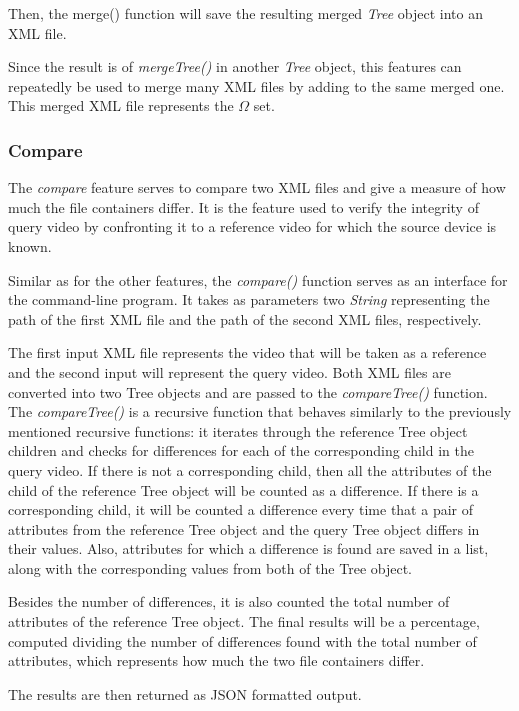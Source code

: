 Then, the merge() function will save the resulting merged \emph{Tree} object into an XML file.

Since the result is of \emph{mergeTree()} in another \emph{Tree} object, this features can repeatedly be used to merge many XML files by adding to the same merged one. This merged XML file represents the $\Omega$ set.

\subsubsection{Compare}

The \emph{compare} feature serves to compare two XML files and give a measure of how much the file containers differ. It is the feature used to verify the integrity of query video by confronting it to a reference video for which the source device is known.

Similar as for the other features, the \emph{compare()} function serves as an interface for the command-line program. It takes as parameters two \emph{String} representing the path of the first XML file and the path of the second XML files, respectively.

The first input XML file represents the video that will be taken as a reference and the second input will represent the query video. Both XML files are converted into two Tree objects and are passed to the \emph{compareTree()} function. The \emph{compareTree()} is a recursive function that behaves similarly to the previously mentioned recursive functions: it iterates through the reference Tree object children and checks for differences for each of the corresponding child in the query video. If there is not a corresponding child, then all the attributes of the child of the reference Tree object will be counted as a difference. If there is a corresponding child, it will be counted a difference every time that a pair of attributes from the reference Tree object and the query Tree object differs in their values. Also, attributes for which a difference is found are saved in a list, along with the corresponding values from both of the Tree object.

Besides the number of differences, it is also counted the total number of attributes of the reference Tree object. The final results will be a percentage, computed dividing the number of differences found with the total number of attributes, which represents how much the two file containers differ.

The results are then returned as JSON formatted output.

